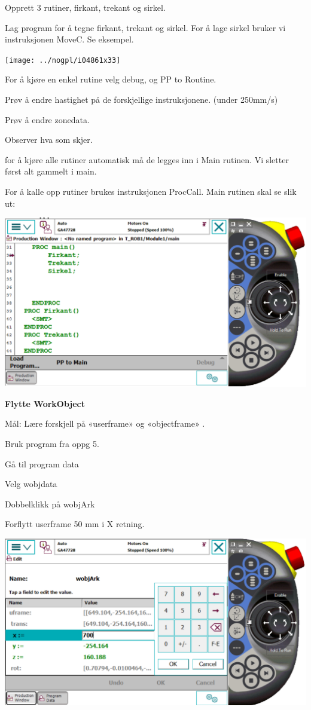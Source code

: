 Opprett 3 rutiner, firkant, trekant og sirkel. 

Lag program for å tegne firkant, trekant og sirkel. For å lage sirkel
bruker vi instruksjonen MoveC. Se eksempel. 

\texttt{[image: ../nogpl/i04861x33]}

For å kjøre en enkel rutine velg debug, og PP to Routine. 

Prøv å endre hastighet på de forskjellige instruksjonene. (under 250mm/s) 

Prøv å endre zonedata. 

Observer hva som skjer. 

for å kjøre alle rutiner automatisk må de legges inn i Main rutinen.
Vi sletter først alt gammelt i main. 

For å kalle opp rutiner brukes instruksjonen ProcCall. Main rutinen
skal se slik ut: 

\includegraphics[width=1\textwidth]{i04861x34}

\textbf{Flytte WorkObject}

Mål: Lære forskjell på «userframe» og «objectframe» . 

Bruk program fra oppg 5. 

Gå til program data 

Velg wobjdata 

Dobbelklikk på wobjArk 

Forflytt userframe 50 mm i X retning. 

\includegraphics[width=1\textwidth]{i04861x35}


